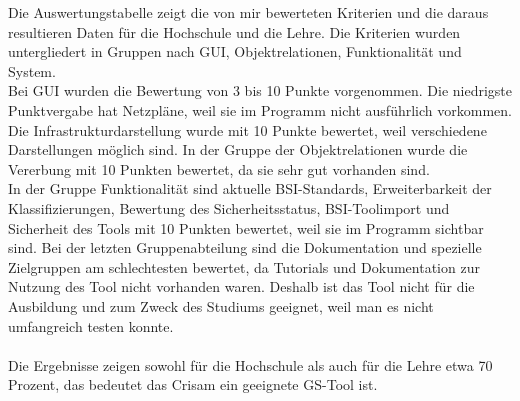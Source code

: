 Die Auswertungstabelle zeigt die von mir bewerteten Kriterien und die daraus resultieren Daten für die Hochschule und die Lehre. 
Die Kriterien wurden untergliedert in Gruppen nach GUI, Objektrelationen, Funktionalität und System.
\\
Bei GUI wurden die Bewertung von 3 bis 10 Punkte vorgenommen. 
Die niedrigste Punktvergabe hat Netzpläne, weil sie im Programm nicht ausführlich vorkommen.
\\
Die Infrastrukturdarstellung wurde mit 10 Punkte bewertet, weil verschiedene Darstellungen möglich sind.
In der Gruppe der Objektrelationen wurde die Vererbung mit 10 Punkten bewertet, da sie sehr gut vorhanden sind.
\\
In der Gruppe Funktionalität sind aktuelle BSI-Standards, Erweiterbarkeit der Klassifizierungen, Bewertung des Sicherheitsstatus, BSI-Toolimport und Sicherheit des Tools mit 10 Punkten bewertet, weil sie im Programm sichtbar sind.
Bei der letzten Gruppenabteilung sind die Dokumentation und spezielle Zielgruppen am schlechtesten bewertet, da Tutorials und Dokumentation zur Nutzung des Tool nicht vorhanden waren. Deshalb ist das Tool nicht für die Ausbildung und zum Zweck des Studiums geeignet, weil man es nicht umfangreich testen konnte.
\\
\\
Die Ergebnisse zeigen sowohl für die Hochschule als auch für die Lehre etwa 70 Prozent, das bedeutet das Crisam ein geeignete GS-Tool ist.